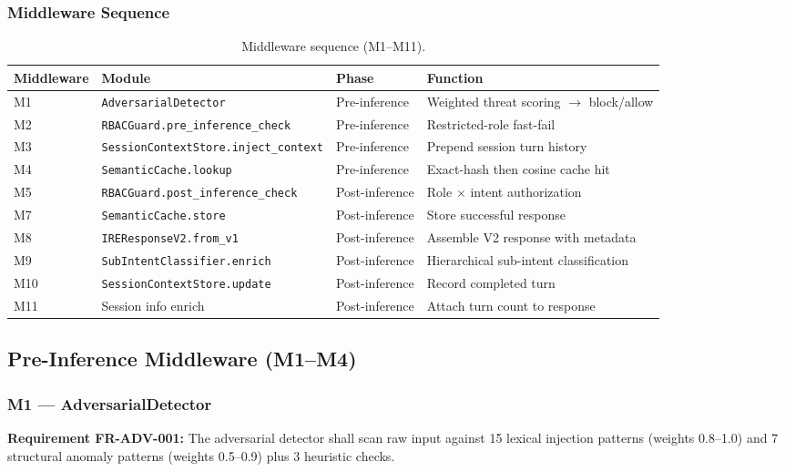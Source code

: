 \documentclass[10pt,journal,onecolumn]{IEEEtran}
\newcommand{\reqid}[1]{\textbf{#1}}
\begin{document}
\subsubsection{Middleware Sequence}
\begin{table}[t]
\caption{Middleware sequence (M1--M11).}
\label{tab:middleware}
\begin{tabularx}{\textwidth}{l l l X}
\toprule
\textbf{Middleware} & \textbf{Module} & \textbf{Phase} & \textbf{Function}\\
\midrule
M1 & \texttt{AdversarialDetector} & Pre-inference & Weighted threat scoring $\rightarrow$ block/allow\\
M2 & \texttt{RBACGuard.pre\_inference\_check} & Pre-inference & Restricted-role fast-fail\\
M3 & \texttt{SessionContextStore.inject\_context} & Pre-inference & Prepend session turn history\\
M4 & \texttt{SemanticCache.lookup} & Pre-inference & Exact-hash then cosine cache hit\\
M5 & \texttt{RBACGuard.post\_inference\_check} & Post-inference & Role $\times$ intent authorization\\
M7 & \texttt{SemanticCache.store} & Post-inference & Store successful response\\
M8 & \texttt{IREResponseV2.from\_v1} & Post-inference & Assemble V2 response with metadata\\
M9 & \texttt{SubIntentClassifier.enrich} & Post-inference & Hierarchical sub-intent classification\\
M10 & \texttt{SessionContextStore.update} & Post-inference & Record completed turn\\
M11 & Session info enrich & Post-inference & Attach turn count to response\\
\bottomrule
\end{tabularx}
\end{table}

\subsection{Pre-Inference Middleware (M1--M4)}

\subsubsection{M1 --- AdversarialDetector}
\reqid{Requirement FR-ADV-001:} The adversarial detector shall scan raw input against 15 lexical injection patterns (weights 0.8--1.0) and 7 structural anomaly patterns (weights 0.5--0.9) plus 3 heuristic checks.
\end{document}
